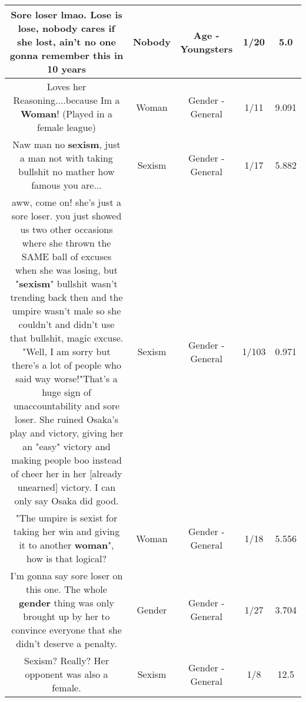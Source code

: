 \documentclass[11pt]{article}
\newlength\mylength
\begin{document}
\begin{center}
\begin{longtable}{|C{.65\mylength}|C{.30\mylength}|C{.12\mylength}|C{.12\mylength}|C{.12\mylength}|}
  \small Sore loser lmao. Lose is lose, \textbf{nobody} cares if she lost, ain't no one gonna remember this in 10 years\normalsize   & Nobody & Age - Youngsters & 1/20 & 5.0 \\  \hline
  \small Loves her Reasoning....because Im a \textbf{Woman}! (Played in a female league)\normalsize   & Woman & Gender - General & 1/11 & 9.091 \\  \hline
  \small Naw man no \textbf{sexism}, just a man not with taking bullshit no mather how famous you are...\normalsize   & Sexism & Gender - General & 1/17 & 5.882 \\  \hline
  \small aww, come on! she's just a sore loser. you just showed us two other occasions where she thrown the SAME ball of excuses when she was losing, but "\textbf{sexism}" bullshit wasn't trending back then and the umpire wasn't male so she couldn't and didn't use that bullshit, magic excuse. "Well, I am sorry but there's a lot of people who said way worse!"That's a huge sign of unaccountability and sore loser. She ruined Osaka's play and victory, giving her an "easy" victory and making people boo instead of cheer her in her [already unearned] victory. I can only say Osaka did good.\normalsize   & Sexism & Gender - General & 1/103 & 0.971 \\  \hline
  \small "The umpire is sexist for taking her win and giving it to another \textbf{woman}", how is that logical?\normalsize   & Woman & Gender - General & 1/18 & 5.556 \\  \hline
  \small I'm gonna say sore loser on this one. The whole \textbf{gender} thing was only brought up by her to convince everyone that she didn't deserve a penalty.\normalsize   & Gender & Gender - General & 1/27 & 3.704 \\  \hline
  \small Sexism? Really? Her opponent was also a female.\normalsize   & Sexism & Gender - General & 1/8 & 12.5 \\  \hline

\end{longtable}
\end{center}
\end{document}
